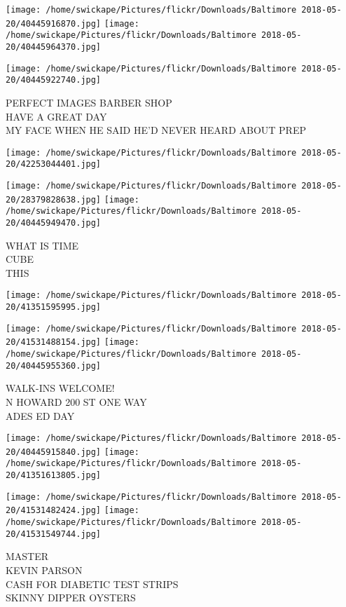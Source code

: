 \documentclass[10pt,letterpaper]{article}
\begin{document}
\texttt{[image: /home/swickape/Pictures/flickr/Downloads/Baltimore 2018-05-20/40445916870.jpg]}
\texttt{[image: /home/swickape/Pictures/flickr/Downloads/Baltimore 2018-05-20/40445964370.jpg]}

\texttt{[image: /home/swickape/Pictures/flickr/Downloads/Baltimore 2018-05-20/40445922740.jpg]}

PERFECT IMAGES BARBER SHOP\\
HAVE A GREAT DAY\\
MY FACE WHEN HE SAID HE'D NEVER HEARD ABOUT PREP
\pagebreak

\texttt{[image: /home/swickape/Pictures/flickr/Downloads/Baltimore 2018-05-20/42253044401.jpg]}

\vspace{0.25in}
\texttt{[image: /home/swickape/Pictures/flickr/Downloads/Baltimore 2018-05-20/28379828638.jpg]}
\texttt{[image: /home/swickape/Pictures/flickr/Downloads/Baltimore 2018-05-20/40445949470.jpg]}

WHAT IS TIME\\
CUBE\\
THIS
\pagebreak

\texttt{[image: /home/swickape/Pictures/flickr/Downloads/Baltimore 2018-05-20/41351595995.jpg]}

\vspace{0.25in}
\texttt{[image: /home/swickape/Pictures/flickr/Downloads/Baltimore 2018-05-20/41531488154.jpg]}
\texttt{[image: /home/swickape/Pictures/flickr/Downloads/Baltimore 2018-05-20/40445955360.jpg]}

WALK{-}INS WELCOME!\\
N HOWARD 200 ST ONE WAY\\
ADES ED DAY
\pagebreak

\texttt{[image: /home/swickape/Pictures/flickr/Downloads/Baltimore 2018-05-20/40445915840.jpg]}
\texttt{[image: /home/swickape/Pictures/flickr/Downloads/Baltimore 2018-05-20/41351613805.jpg]}

\texttt{[image: /home/swickape/Pictures/flickr/Downloads/Baltimore 2018-05-20/41531482424.jpg]}
\texttt{[image: /home/swickape/Pictures/flickr/Downloads/Baltimore 2018-05-20/41531549744.jpg]}

MASTER\\
KEVIN PARSON\\
CASH FOR DIABETIC TEST STRIPS\\
SKINNY DIPPER OYSTERS
\pagebreak
\end{document}
